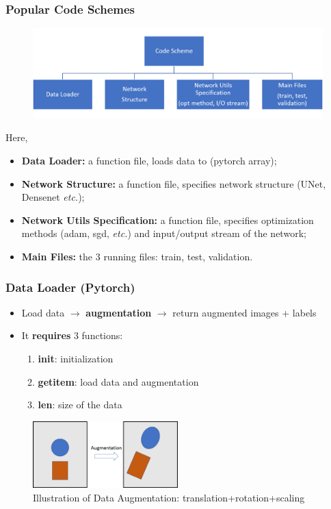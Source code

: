 \documentclass[10pt]{beamer}
\newcommand{\etc}{{\it etc.}}
\begin{document}
\begin{frame}
\frametitle{Popular Code Schemes}
	\begin{figure}[H]
	\centerline{
		\includegraphics[width=1.0\textwidth]{code_scheme.png}
	}
\end{figure}
Here,
\begin{itemize}
	\item \textbf{Data Loader:} a function file, loads data to (pytorch array);
	\item \textbf{Network Structure:} a function file, specifies network structure (UNet, Densenet \etc);
	\item \textbf{Network Utils Specification:} a function file, specifies optimization methods (adam, sgd, \etc) and input/output stream of the network;
	\item \textbf{Main Files:}  the 3 running files: train, test, validation.  
\end{itemize} 
\end{frame}


\begin{frame}
\frametitle{Data Loader (Pytorch)}
\begin{itemize}
	\item Load data $\rightarrow$ \textbf{augmentation} $\rightarrow$ return augmented images + labels
	\vskip 0.2in
	\item It \textbf{requires} 3 functions:
	\begin{enumerate}
		\item \textbf{init}: initialization
		\item \textbf{getitem}: load data and augmentation
		\item \textbf{len}: size of the data
	\end{enumerate}
\end{itemize}
	\begin{figure}[H]
	\centerline{
		\includegraphics[width=0.5\textwidth]{augmentation.png}
	}\caption{Illustration of Data Augmentation: translation+rotation+scaling}
\end{figure}
\end{frame}
\end{document}
